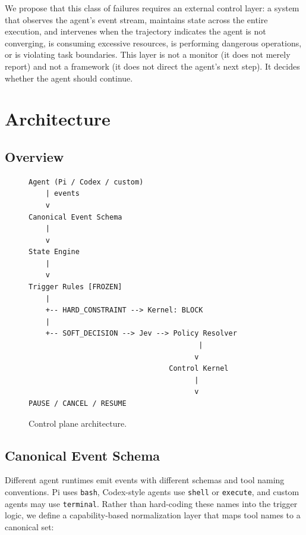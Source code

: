 \documentclass[11pt,a4paper]{article}
\begin{document}
We propose that this class of failures requires an external control layer: a system that observes the agent's event stream, maintains state across the entire execution, and intervenes when the trajectory indicates the agent is not converging, is consuming excessive resources, is performing dangerous operations, or is violating task boundaries. This layer is not a monitor (it does not merely report) and not a framework (it does not direct the agent's next step). It decides whether the agent should continue.

\section{Architecture}

\subsection{Overview}

\begin{figure}[H]
\centering
\begin{verbatim}
Agent (Pi / Codex / custom)
    | events
    v
Canonical Event Schema
    |
    v
State Engine
    |
    v
Trigger Rules [FROZEN]
    |
    +-- HARD_CONSTRAINT --> Kernel: BLOCK
    |
    +-- SOFT_DECISION --> Jev --> Policy Resolver
                                        |
                                       v
                                 Control Kernel
                                       |
                                       v
PAUSE / CANCEL / RESUME
\end{verbatim}
\caption{Control plane architecture.}
\end{figure}

\subsection{Canonical Event Schema}

Different agent runtimes emit events with different schemas and tool naming conventions. Pi uses \texttt{bash}, Codex-style agents use \texttt{shell} or \texttt{execute}, and custom agents may use \texttt{terminal}. Rather than hard-coding these names into the trigger logic, we define a capability-based normalization layer that maps tool names to a canonical set:
\end{document}
